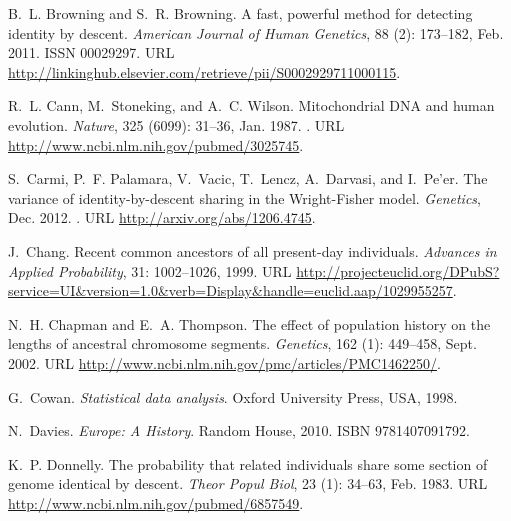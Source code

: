 \documentclass{article}
\begin{document}
\begin{thebibliography}{76}
B.~L. Browning and S.~R. Browning.
\newblock A fast, powerful method for detecting identity by descent.
\newblock \emph{American Journal of Human Genetics}, 88 (2):
  173--182, Feb. 2011.
\newblock ISSN 00029297.
\newblock URL
  \url{http://linkinghub.elsevier.com/retrieve/pii/S0002929711000115}.

R.~L. Cann, M.~Stoneking, and A.~C. Wilson.
\newblock Mitochondrial {DNA} and human evolution.
\newblock \emph{Nature}, 325 (6099): 31--36, Jan. 1987.
\newblock {}.
\newblock URL \url{http://www.ncbi.nlm.nih.gov/pubmed/3025745}.

S.~Carmi, P.~F. Palamara, V.~Vacic, T.~Lencz, A.~Darvasi, and I.~Pe'er.
\newblock The variance of identity-by-descent sharing in the {Wright}-{Fisher}
  model.
\newblock \emph{Genetics}, Dec. 2012.
\newblock {}.
\newblock URL \url{http://arxiv.org/abs/1206.4745}.

J.~Chang.
\newblock Recent common ancestors of all present-day individuals.
\newblock \emph{Advances in Applied Probability}, 31: 1002--1026,
  1999.
\newblock URL
  \url{http://projecteuclid.org/DPubS?service=UI&version=1.0&verb=Display&handle=euclid.aap/1029955257}.

N.~H. Chapman and E.~A. Thompson.
\newblock The effect of population history on the lengths of ancestral
  chromosome segments.
\newblock \emph{Genetics}, 162 (1): 449--458, Sept. 2002.
\newblock URL \url{http://www.ncbi.nlm.nih.gov/pmc/articles/PMC1462250/}.

G.~Cowan.
\newblock \emph{Statistical data analysis}.
\newblock Oxford University Press, USA, 1998.

N.~Davies.
\newblock \emph{Europe: {A} History}.
\newblock Random House, 2010.
\newblock ISBN 9781407091792.

K.~P. Donnelly.
\newblock The probability that related individuals share some section of genome
  identical by descent.
\newblock \emph{Theor Popul Biol}, 23 (1): 34--63, Feb. 1983.
\newblock URL \url{http://www.ncbi.nlm.nih.gov/pubmed/6857549}.


\end{thebibliography}
\end{document}
